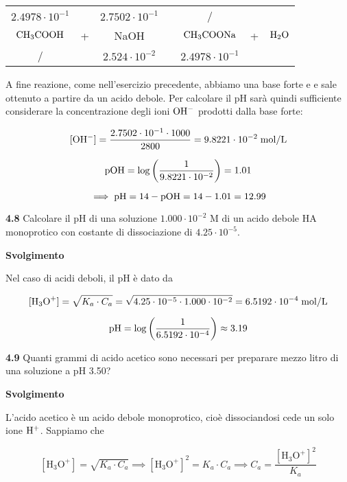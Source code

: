 \begin{center}
    \begin{tabular}{ccccccc}
        $2.4978 \cdot 10^{-1}$ &  & $2.7502 \cdot 10^{-1}$ & & / &&\\
        $\rm CH_3COOH$ & + & NaOH & \ce{->} & $\rm CH_3COONa$ & + & $\rm H_2O$\\
        / &  &  $2.524 \cdot 10^{-2}$ & & $2.4978 \cdot 10^{-1}$&&\\
    \end{tabular}
\end{center}

A fine reazione, come nell'esercizio precedente, abbiamo una base forte e e sale ottenuto a partire da un acido debole. Per calcolare il pH sarà quindi sufficiente considerare la concentrazione degli ioni $\rm OH^-$ prodotti dalla base forte:

$$[\rm OH^-]=\frac{2.7502 \cdot 10^{-1} \cdot 1000}{2800}=9.8221 \cdot 10^{-2} \; \rm mol/L$$

$$\rm pOH=\log{\left(\frac{1}{9.8221 \cdot 10^{-2}}\right)}=1.01$$

$$\implies \rm pH=14-pOH=14-1.01=12.99$$

\vspace{0.2cm}\textbf{4.8} Calcolare il pH di una soluzione $1.000 \cdot 10^{-2}$ M di un acido debole HA monoprotico con costante di dissociazione di $4.25 \cdot 10^{-5}$.

\vspace{0.2cm}\large\textbf{Svolgimento}\normalsize

\vspace{0.2cm}Nel caso di acidi deboli, il pH è dato da

$$[\text{H}_3\text{O}^+]
=\sqrt{K_a \cdot C_a}
=\sqrt{4.25 \cdot 10^{-5} \cdot 1.000 \cdot 10^{-2}}
=6.5192 \cdot 10^{-4} \; \rm mol/L$$

$$\rm pH=\log{\left(\frac{1}{6.5192 \cdot 10^{-4}}\right)}\approx 3.19$$

\vspace{0.2cm}\textbf{4.9} Quanti grammi di acido acetico sono necessari per preparare mezzo litro di una soluzione a pH 3.50?

\vspace{0.2cm}\large\textbf{Svolgimento}\normalsize

\vspace{0.2cm}L'acido acetico è un acido debole monoprotico, cioè dissociandosi cede un solo ione $\rm H^+$. Sappiamo che

$$[\text{H}_3\text{O}^+] = \sqrt{K_a \cdot C_a}
\implies
[\text{H}_3\text{O}^+]^2 = K_a \cdot C_a
\implies
C_a=\frac{[\text{H}_3\text{O}^+]^2}{K_a}$$

